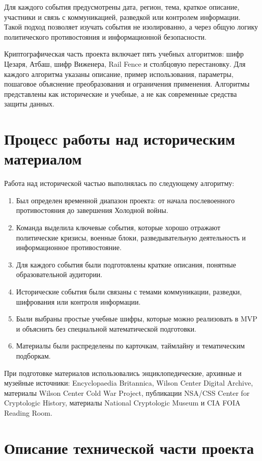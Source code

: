 \documentclass[14pt,a4paper]{extarticle}
\begin{document}
Для каждого события предусмотрены дата, регион, тема, краткое описание, участники и связь с коммуникацией, разведкой или контролем информации. Такой подход позволяет изучать события не изолированно, а через общую логику политического противостояния и информационной безопасности.

Криптографическая часть проекта включает пять учебных алгоритмов: шифр Цезаря, Атбаш, шифр Виженера, Rail Fence и столбцовую перестановку. Для каждого алгоритма указаны описание, пример использования, параметры, пошаговое объяснение преобразования и ограничения применения. Алгоритмы представлены как исторические и учебные, а не как современные средства защиты данных.

\section{Процесс работы над историческим материалом}

Работа над исторической частью выполнялась по следующему алгоритму:

\begin{enumerate}
  \item Был определен временной диапазон проекта: от начала послевоенного противостояния до завершения Холодной войны.
  \item Команда выделила ключевые события, которые хорошо отражают политические кризисы, военные блоки, разведывательную деятельность и информационное противостояние.
  \item Для каждого события были подготовлены краткие описания, понятные образовательной аудитории.
  \item Исторические события были связаны с темами коммуникации, разведки, шифрования или контроля информации.
  \item Были выбраны простые учебные шифры, которые можно реализовать в MVP и объяснить без специальной математической подготовки.
  \item Материалы были распределены по карточкам, таймлайну и тематическим подборкам.
\end{enumerate}

При подготовке материалов использовались энциклопедические, архивные и музейные источники: Encyclopaedia Britannica, Wilson Center Digital Archive, материалы Wilson Center Cold War Project, публикации NSA/CSS Center for Cryptologic History, материалы National Cryptologic Museum и CIA FOIA Reading Room.

\section{Описание технической части проекта}
\end{document}
